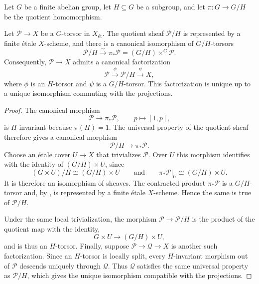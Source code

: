 Let $G$ be a finite abelian group, let $H\subseteq G$ be a subgroup, and let
$\pi:G\to G/H$ be the quotient homomorphism.

\begin{prop}\label{prop:quotient_torsors_finite}\label{prop:quotient_torsors}
Let $\mathcal{P}\to X$ be a $G$-torsor in $X_{\text{ét}}$. The quotient sheaf
$\mathcal{P}/H$ is represented by a finite étale $X$-scheme, and there is a
canonical isomorphism of $G/H$-torsors
\[
\mathcal{P}/H \xrightarrow{\sim}
\pi_*\mathcal{P}=(G/H)\times^G\mathcal{P}.
\]
Consequently, $\mathcal{P}\to X$ admits a canonical factorization
\[
\mathcal{P}\xrightarrow{\phi}\mathcal{P}/H\xrightarrow{\psi}X,
\]
where $\phi$ is an $H$-torsor and $\psi$ is a $G/H$-torsor. This
factorization is unique up to a unique isomorphism commuting with the
projections.
\end{prop}

\begin{proof}
The canonical morphism
\[
\mathcal{P}\longrightarrow\pi_*\mathcal{P},
\qquad p\longmapsto[1,p],
\]
is $H$-invariant because $\pi(H)=1$. The universal property of the quotient
sheaf therefore gives a canonical morphism
\[
\mathcal{P}/H\longrightarrow\pi_*\mathcal{P}.
\]
Choose an étale cover $U\to X$ that trivializes $\mathcal{P}$. Over $U$ this
morphism identifies with the identity of $(G/H)\times U$, since
\[
(G\times U)/H\cong(G/H)\times U
\qquad\text{and}\qquad
\pi_*\mathcal{P}|_U\cong(G/H)\times U.
\]
It is therefore an isomorphism of sheaves. The contracted product
$\pi_*\mathcal{P}$ is a $G/H$-torsor and, by
, is represented by a finite
étale $X$-scheme. Hence the same is true of $\mathcal{P}/H$.

Under the same local trivialization, the morphism
$\mathcal{P}\to\mathcal{P}/H$ is the product of the quotient map with the
identity,
\[
G\times U\longrightarrow(G/H)\times U,
\]
and is thus an $H$-torsor. Finally, suppose
$\mathcal{P}\to\mathcal{Q}\to X$ is another such factorization. Since an
$H$-torsor is locally split, every $H$-invariant morphism out of
$\mathcal{P}$ descends uniquely through $\mathcal{Q}$. Thus $\mathcal{Q}$
satisfies the same universal property as $\mathcal{P}/H$, which gives the
unique isomorphism compatible with the projections.
\end{proof}

